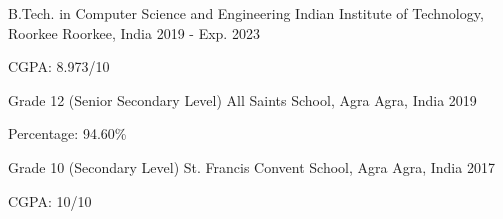 

\begin{cventries}

  \cventry
    {B.Tech. in Computer Science and Engineering} %
    {Indian Institute of Technology, Roorkee} %
    {Roorkee, India} %
    {2019 - Exp. 2023} %
    {
      \begin{cvitems} %
        \item {CGPA: 8.973/10}
      \end{cvitems}
    }

  \cventry
    {Grade 12 (Senior Secondary Level)} %
    {All Saints School, Agra} %
    {Agra, India} %
    {2019} %
    {
      \begin{cvitems} %
        \item {Percentage: 94.60\%}
      \end{cvitems}
    }

  \cventry
    {Grade 10 (Secondary Level)} %
    {St. Francis Convent School, Agra} %
    {Agra, India} %
    {2017} %
    {
      \begin{cvitems} %
        \item {CGPA: 10/10}
      \end{cvitems}
    }

\end{cventries}
